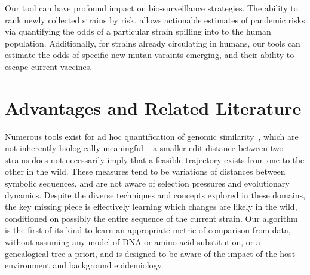 \documentclass[onecolumn, compsoc,10pt]{IEEEtran}
\begin{document}
Our tool can  have profound impact on  bio-surveillance strategies. The ability to rank newly collected strains by risk, allows actionable estimates of  pandemic risks via  quantifying the odds of a particular strain spilling into to the human population. Additionally,  for strains already circulating in humans, our tools can estimate the odds  of specific  new mutan varaints emerging, and their ability to  escape current vaccines. %





\section*{\qnet Advantages and Related Literature}

Numerous tools exist for ad hoc quantification of genomic similarity~\cite{posada1998modeltest,goldberger2005genomic,huelsenbeck1997phylogeny,neher2014predicting,VanderMeer2010,Smith2009}, which are not inherently biologically meaningful -- a smaller edit distance between two strains does not necessarily imply that a feasible trajectory exists from one to the other in the wild. These measures tend to be  variations of distances between symbolic sequences, and are not aware of selection pressures and evolutionary dynamics. Despite the diverse techniques and concepts explored in these domains, the key missing piece is effectively learning which changes are likely in the wild, conditioned on possibly the entire sequence of the current strain. Our algorithm is the first of its kind to learn an appropriate metric of comparison from data, without assuming any model of DNA or amino acid substitution, or a genealogical tree a priori, and is  designed to be aware of the impact of the  host environment and background epidemiology.
\end{document}

